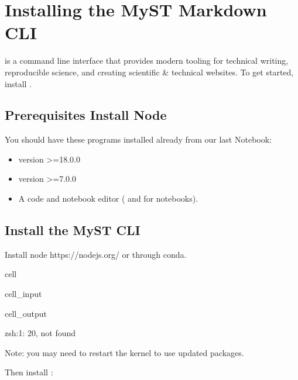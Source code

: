 \documentclass[letterpaper,12pt,english]{sphinxmanual}
\begin{document}
\section{Installing the MyST Markdown CLI}
\label{\detokenize{notebooks/02-myst.integration:installing-the-myst-markdown-cli}}
\sphinxAtStartPar
{} is a command line interface that provides modern tooling for technical writing, reproducible science, and creating scientific \& technical websites. To get started, install .


\subsection{Prerequisites \sphinxhyphen{} Install Node}
\label{\detokenize{notebooks/02-myst.integration:prerequisites-install-node}}
\sphinxAtStartPar
You should have these programs installed already from our last Notebook:
\begin{itemize}
\item {} 
\sphinxAtStartPar
{} version \textgreater{}=18.0.0

\item {} 
\sphinxAtStartPar
{} version \textgreater{}=7.0.0

\item {} 
\sphinxAtStartPar
A code and notebook editor ( and  for notebooks).

\end{itemize}


\subsection{Install the MyST CLI}
\label{\detokenize{notebooks/02-myst.integration:install-the-myst-cli}}
\sphinxAtStartPar
Install node https://nodejs.org/ or through conda.

\begin{sphinxuseclass}{cell}
\begin{sphinxuseclass}{cell_input}
\begin{sphinxVerbatim}[commandchars=\\\{\}]
    
\end{sphinxVerbatim}

\end{sphinxuseclass}
\begin{sphinxuseclass}{cell_output}
\begin{sphinxVerbatim}[commandchars=\\\{\}]
zsh:1: 20, not found

Note: you may need to restart the kernel to use updated packages.
\end{sphinxVerbatim}

\end{sphinxuseclass}
\end{sphinxuseclass}
\sphinxAtStartPar
Then install :
\end{document}
